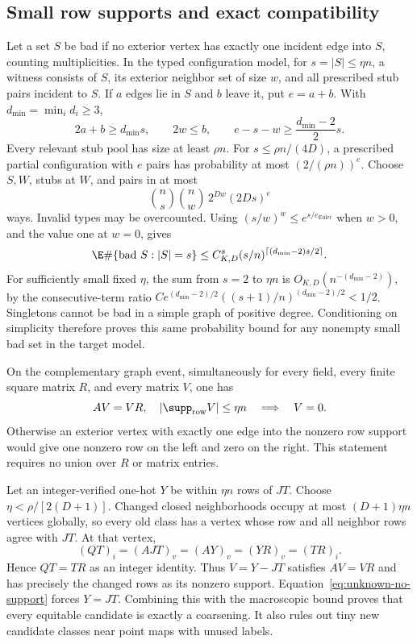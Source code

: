 \subsection{Small row supports and exact compatibility}
Let a set $S$ be bad if no exterior vertex has exactly one incident
edge into $S$, counting multiplicities. In the typed configuration
model, for $s=|S|\le\eta n$, a witness consists of $S$, its exterior
neighbor set of size $w$, and all prescribed stub pairs incident to
$S$. If $a$ edges lie in $S$ and $b$ leave it, put $e=a+b$.
With $d_{\min}=\min_i d_i\ge3$,
\[
 2a+b\ge d_{\min}s,\qquad 2w\le b,\qquad
 e-s-w\ge\frac{d_{\min}-2}{2}s.
\]
Every relevant stub pool has size at least $\rho n$.
For $s\le\rho n/(4D)$, a prescribed partial configuration with
$e$ pairs has probability at most $(2/(\rho n))^e$.
Choose $S,W$, stubs at $W$, and pairs in at most
\[
 \binom ns\binom nw\,2^{Dw}(2Ds)^e
\]
ways. Invalid types may be overcounted. Using
$(s/w)^w\le e^{s/e_{\mathrm{Euler}}}$ when $w>0$, and the value one
at $w=0$, gives
\begin{equation}\label{eq:unknown-support}
 \E\#\{\text{bad }S:|S|=s\}
 \le C_{K,D}^s(s/n)^{\lceil(d_{\min}-2)s/2\rceil}.
\end{equation}
For sufficiently small fixed $\eta$, the sum from $s=2$ to $\eta n$
is $O_{K,D}(n^{-(d_{\min}-2)})$, by the consecutive-term ratio
$C e^{(d_{\min}-2)/2}((s+1)/n)^{(d_{\min}-2)/2}<1/2$.
Singletons cannot be bad in a simple graph of positive degree.
Conditioning on simplicity therefore proves this same probability
bound for any nonempty small bad set in the target model.

On the complementary graph event, simultaneously for every field,
every finite square matrix $R$, and every matrix $V$, one has
\begin{equation}\label{eq:unknown-no-support}
 AV=VR,\quad |\supp_{\mathrm{row}}V|\le\eta n
 \quad\Longrightarrow\quad V=0.
\end{equation}
Otherwise an exterior vertex with exactly one edge into the nonzero
row support would give one nonzero row on the left and zero on the
right. This statement requires no union over $R$ or matrix entries.

Let an integer-verified one-hot $Y$ be within $\eta n$ rows of $JT$.
Choose $\eta<\rho/[2(D+1)]$. Changed closed neighborhoods occupy at
most $(D+1)\eta n$ vertices globally, so every old class has a vertex
whose row and all neighbor rows agree with $JT$. At that vertex,
\[
 (QT)_i=(AJT)_v=(AY)_v=(YR)_v=(TR)_i.
\]
Hence $QT=TR$ as an integer identity. Thus $V=Y-JT$ satisfies
$AV=VR$ and has precisely the changed rows as its nonzero support.
Equation~\eqref{eq:unknown-no-support} forces $Y=JT$.
Combining this with the macroscopic bound proves that every
equitable candidate is exactly a coarsening. It also rules out tiny
new candidate classes near point maps with unused labels.

